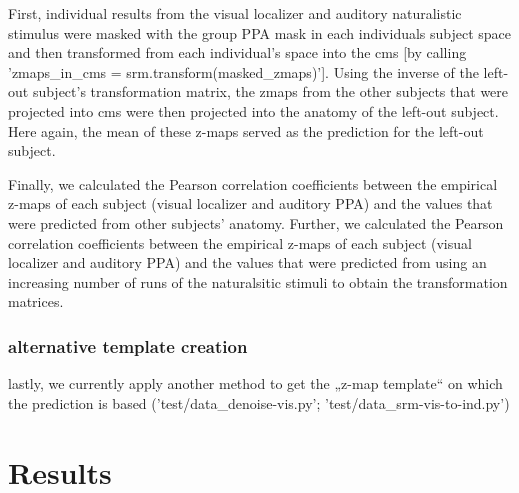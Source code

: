 First, individual results from the visual localizer and auditory naturalistic
stimulus were masked with the group PPA mask in each individuals subject space
and then transformed from each individual's space into the \ac{cms} [by calling
'zmaps\_in\_cms = srm.transform(masked\_zmaps)'].
Using the inverse of the left-out subject's transformation matrix, the zmaps
from the other subjects that were projected into \ac{cms} were then projected
into the anatomy of the left-out subject.
%
Here again, the mean of these z-maps served as the prediction for the left-out
subject.


Finally, we calculated the Pearson correlation coefficients between the
empirical z-maps of each subject (visual localizer and auditory PPA) and the
values that were predicted from other subjects' anatomy.
%
Further, we calculated the Pearson correlation coefficients between the
empirical z-maps of each subject (visual localizer and auditory PPA) and the
values that were predicted from using an increasing number of runs of the
naturalsitic stimuli to obtain the transformation matrices.


\subsubsection{alternative template creation}
%
lastly, we currently apply another method to get the „z-map template“ on which
the prediction is based ('test/data\_denoise-vis.py';
'test/data\_srm-vis-to-ind.py')


\section{Results}


